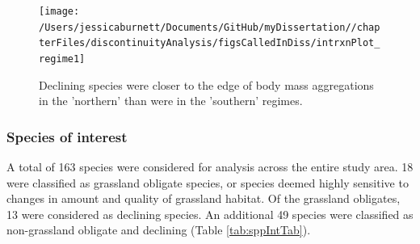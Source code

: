 \documentclass[12pt,twoside,openany]{reedthesis}
\begin{document}
\begin{figure}
\texttt{[image: /Users/jessicaburnett/Documents/GitHub/myDissertation//chapterFiles/discontinuityAnalysis/figsCalledInDiss/intrxnPlot\_regime1]} \caption{Declining species were closer to the edge of body mass aggregations in the 'northern' than were in the 'southern' regimes.}\label{fig:intrxnPlot-regime}
\end{figure}
\hypertarget{species-of-interest}{%
\subsubsection{Species of interest}\label{species-of-interest}}

A total of 163 species were considered for analysis across the entire study area. 18 were classified as grassland obligate species, or species deemed highly sensitive to changes in amount and quality of grassland habitat. Of the grassland obligates, 13 were considered as declining species. An additional 49 species were classified as non-grassland obligate and declining (Table \ref{tab:sppIntTab}).
\end{document}
